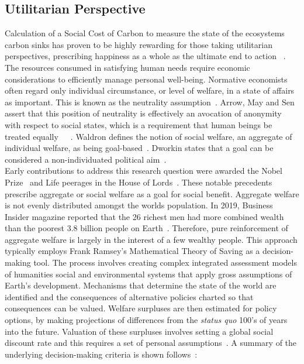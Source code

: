 \documentclass[11pt, oneside]{article}   	%
\begin{document}
\subsection{Utilitarian Perspective}

Calculation of a Social Cost of Carbon to measure the state of the ecosystems carbon sinks has proven to be highly rewarding for those taking utilitarian perspectives, prescribing happiness as a whole as the ultimate end to action ~\cite{hs1}.
The resources consumed in satisfying human needs require economic considerations to efficiently manage personal well-being. Normative economists often regard only individual circumstance, or level of  welfare, in a state of affairs as important.
This is known as the neutrality assumption~\cite{pd2}.
Arrow, May and Sen assert that this position of neutrality is effectively an avocation of anonymity with respect to social states, which is a requirement that human beings be treated equally~\cite{ka1}~\cite{km1}~\cite{as2}.
Waldron defines the notion of social welfare, an aggregate of individual welfare, as being goal-based~\cite{jw2}.
Dworkin states that a goal can be considered a non-individuated political aim~\cite{rd1}.\\

Early contributions to address this research question were awarded the Nobel Prize~\cite{np1} and Life peerages in the House of Lords~\cite{g1}.
These notable precedents prescribe aggregate or social welfare as a goal for social benefit.
Aggregate welfare is not evenly distributed amongst the worlds population.
In 2019, Business Insider magazine reported that the 26 richest men had more combined wealth than the poorest 3.8 billion people on Earth~\cite{bi1}.
Therefore, pure reinforcement of aggregate welfare is largely in the interest of a few wealthy people.
This approach typically employs Frank Ramsey's Mathematical Theory of Saving as a decision-making tool.
The process involves creating complex integrated assessment models of humanities social and environmental systems that apply gross assumptions of Earth's development.
Mechanisms that determine the state of the world are identified and the consequences of alternative policies charted so that consequences can be valued.
Welfare surpluses are then estimated for policy options, by making projections of differences from the \emph{status quo} 100's of years into the future.
Valuation of these surpluses involves setting a global social discount rate and this requires a set of personal assumptions~\cite{pd2}.
A summary of the underlying decision-making criteria is shown follows~\cite{fr1}:\\
\end{document}
